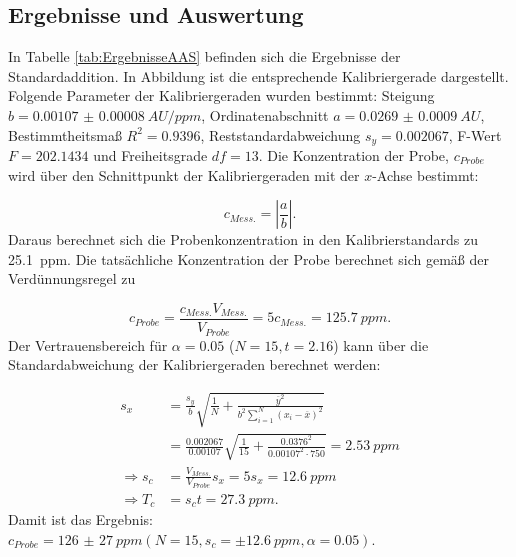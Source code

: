 \subsection{Ergebnisse und Auswertung} \label{sec:ErgebnisseAAS}
  
  In Tabelle \ref{tab:ErgebnisseAAS} befinden sich die Ergebnisse der Standardaddition. In Abbildung ist die entsprechende Kalibriergerade dargestellt. Folgende Parameter der Kalibriergeraden wurden bestimmt: Steigung $b = \SI[mode=text,separate-uncertainty]{0.00107(8)}{AU\per ppm}$, Ordinatenabschnitt $a = \SI[mode=text, separate-uncertainty]{0.0269(9)}{AU}$, Bestimmtheitsmaß $R^2 = 0.9396$, Reststandardabweichung $s_y = 0.002067$, F-Wert $F = 202.1434$ und Freiheitsgrade $df = 13$. Die Konzentration der Probe, $c_{Probe}$ wird über den Schnittpunkt der Kalibriergeraden mit der $x$-Achse bestimmt:
  
    \begin{equation}
      c_{Mess.} = |\frac{a}{b}|.
    \end{equation}
  Daraus berechnet sich die Probenkonzentration in den Kalibrierstandards zu \SI[mode=text]{25.1}{ppm}. Die tatsächliche Konzentration der Probe berechnet sich gemäß der Verdünnungsregel zu
  
    \begin{equation}
      c_{Probe} = \frac{c_{Mess.} V_{Mess.}}{V_{Probe}} = 5 c_{Mess.} = \SI[mode=text]{125.7}{ppm}.
    \end{equation}
  Der Vertrauensbereich für $\alpha = 0.05$ ($N = 15, t = 2.16$) kann über die Standardabweichung der Kalibriergeraden berechnet werden:
  
    \begin{equation}
      \begin{split}
        s_x &= \frac{s_y}{b} \sqrt{\frac{1}{N} + \frac{\overline{y}^2}{b^2 \sum_{i=1}^N \left(x_i - \overline{x}\right)^2}} \\
            &= \frac{0.002067}{0.00107} \sqrt{\frac{1}{15} + \frac{0.0376^2}{0.00107^2 \cdot 750}} = \SI[mode=text]{2.53}{ppm} \\
   \Rightarrow s_c &= \frac{V_{Mess.}}{V_{Probe}} s_x = 5 s_x = \SI[mode=text]{12.6}{ppm} \\
   \Rightarrow T_c &= s_c t = \SI[mode=text]{27.3}{ppm}.
      \end{split}
    \end{equation}
  Damit ist das Ergebnis: $c_{Probe} = \SI[mode=text, multi-part-units = brackets, separate-uncertainty]{126(27)}{ppm} \left(N = 15, s_c = \pm \SI[mode=text]{12.6}{ppm}, \alpha = 0.05\right)$.
  
